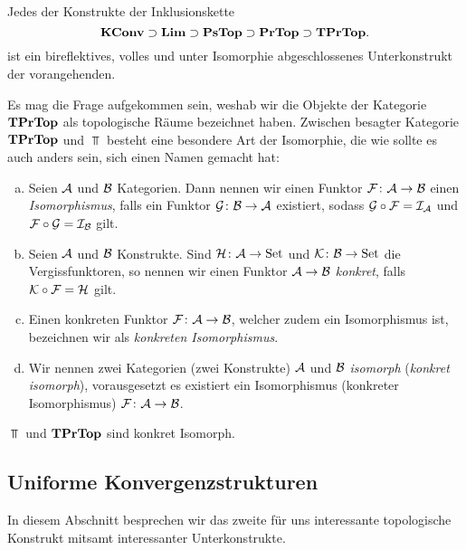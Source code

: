 \begin{prop}
  \label{prop:inklusion}
  Jedes der Konstrukte der Inklusionskette
  $$
  \mathbf{KConv} \supset \mathbf{Lim} \supset \mathbf{PsTop} \supset \mathbf{PrTop} \supset \mathbf{TPrTop}.
  $$
  ist ein bireflektives, volles und unter Isomorphie abgeschlossenes Unterkonstrukt der vorangehenden.
\end{prop}

Es mag die Frage aufgekommen sein, weshab wir die Objekte der Kategorie $\mathbf{TPrTop}$ als topologische Räume bezeichnet haben.
Zwischen besagter Kategorie $\mathbf{TPrTop}$ und $\Top$ besteht eine besondere Art der Isomorphie, die wie sollte es auch anders sein, sich einen Namen gemacht hat:
\begin{defn}
  \begin{enumerate}[a)]
    \item Seien $\mathcal{A}$ und $\mathcal{B}$ Kategorien.
      Dann nennen wir einen Funktor $\mathcal{F} \colon \mathcal{A} \to \mathcal{B}$ einen \emph{Isomorphismus}, falls ein Funktor $\mathcal{G} \colon \mathcal{B} \to \mathcal{A}$ existiert, sodass $\mathcal{G} \circ \mathcal{F} = \mathcal{I}_{\mathcal{A}}$ und $\mathcal{F} \circ \mathcal{G} = \mathcal{I}_{\mathcal{B}}$ gilt.
    \item Seien $\mathcal{A}$ und $\mathcal{B}$ Konstrukte.
      Sind $\mathcal{H} \colon \mathcal{A} \to \mathrm{Set}$ und $\mathcal{K} \colon \mathcal{B} \to \mathrm{Set}$ die Vergissfunktoren, so nennen wir einen Funktor $\mathcal{A} \to \mathcal{B}$ \emph{konkret}, falls $\mathcal{K} \circ \mathcal{F} = \mathcal{H}$ gilt.
    \item Einen konkreten Funktor $\mathcal{F} \colon \mathcal{A} \to \mathcal{B}$, welcher zudem ein Isomorphismus ist, bezeichnen wir als \emph{konkreten Isomorphismus}.
    \item Wir nennen zwei Kategorien (zwei Konstrukte) $\mathcal{A}$ und $\mathcal{B}$ \emph{isomorph} (\emph{konkret isomorph}), vorausgesetzt es existiert ein Isomorphismus (konkreter Isomorphismus) $\mathcal{F} \colon \mathcal{A} \to \mathcal{B}$.
  \end{enumerate}
\end{defn}

\begin{prop}
  $\Top$ und $\mathbf{TPrTop}$ sind konkret Isomorph.
\end{prop}


\subsection{Uniforme Konvergenzstrukturen}

In diesem Abschnitt besprechen wir das zweite für uns interessante topologische Konstrukt mitsamt interessanter Unterkonstrukte.

